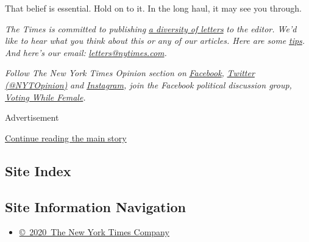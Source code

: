 That belief is essential. Hold on to it. In the long haul, it may see
you through.

\emph{The Times is committed to publishing}
\href{https://www.nytimes.com/2019/01/31/opinion/letters/letters-to-editor-new-york-times-women.html}{\emph{a
diversity of letters}} \emph{to the editor. We'd like to hear what you
think about this or any of our articles. Here are some}
\href{https://help.nytimes.com/hc/en-us/articles/115014925288-How-to-submit-a-letter-to-the-editor}{\emph{tips}}\emph{.
And here's our email:}
\href{mailto:letters@nytimes.com}{\emph{letters@nytimes.com}}\emph{.}

\emph{Follow The New York Times Opinion section on}
\href{https://www.facebook.com/nytopinion}{\emph{Facebook}}\emph{,}
\href{http://twitter.com/NYTOpinion}{\emph{Twitter (@NYTOpinion)}}
\emph{and}
\href{https://www.instagram.com/nytopinion/}{\emph{Instagram}}\emph{,
join the Facebook political discussion group,}
\href{https://www.facebook.com/groups/votingwhilefemale/}{\emph{Voting
While Female}}\emph{.}

Advertisement

\protect\hyperlink{after-bottom}{Continue reading the main story}

\hypertarget{site-index}{%
\subsection{Site Index}\label{site-index}}

\hypertarget{site-information-navigation}{%
\subsection{Site Information
Navigation}\label{site-information-navigation}}

\begin{itemize}
\tightlist
\item
  \href{https://help.nytimes.com/hc/en-us/articles/115014792127-Copyright-notice}{©~2020~The
  New York Times Company}
\end{itemize}

